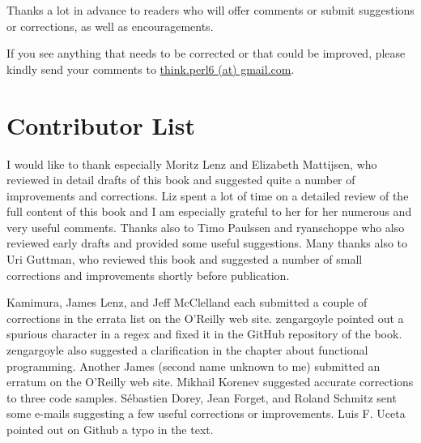 Thanks a lot in advance to readers who will offer comments 
or submit suggestions or corrections, as well as encouragements.

If you see anything that needs to be corrected or that 
could be improved, please kindly send your comments to 
\url{think.perl6 (at) gmail.com}.


\section*{Contributor List}

I would like to thank especially Moritz Lenz and Elizabeth 
Mattijsen, who reviewed in detail drafts of this book 
and suggested quite a number of improvements and corrections. Liz 
spent a lot of time on a detailed review of the full 
content of this book and I am especially grateful to her for 
her numerous and very useful comments. Thanks also to Timo Paulssen and 
ryanschoppe who also reviewed early drafts and provided some  
useful suggestions. Many thanks also to Uri Guttman, who reviewed 
this book and suggested a number of small corrections and improvements 
shortly before publication. 

Kamimura, James Lenz, and Jeff McClelland each submitted a couple 
of corrections in the errata list on the O'Reilly web site.
zengargoyle pointed out a spurious character in a regex 
and fixed it in the GitHub repository of the book. zengargoyle
also suggested a clarification in the chapter about functional 
programming. Another James (second name unknown to me) 
submitted an erratum on the O'Reilly web site. Mikhail Korenev 
suggested accurate corrections to three code samples.  
Sébastien Dorey, Jean Forget, and Roland Schmitz sent some e-mails 
suggesting a few useful corrections or improvements.
Luis F. Uceta pointed out on Github a typo in the text.

\clearemptydoublepage

\begin{latexonly}

\tableofcontents

\clearemptydoublepage

\end{latexonly}

